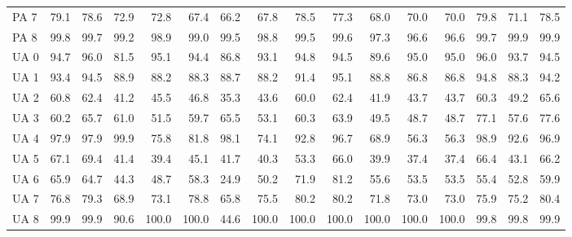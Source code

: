 \documentclass[a4paper,10pt,DIV=16]{scrartcl}
\begin{document}
\begin{table}[h]
\begin{tabular}{lrrrrrrrrrrrrrrr}
    PA 7 & 79.1 & 78.6 & 72.9 & 72.8 & 67.4 & 66.2 & 67.8 & 78.5 & 77.3 & 68.0 & 70.0 & 70.0 & 79.8 & 71.1 & 78.5 \\
    PA 8 & 99.8 & 99.7 & 99.2 & 98.9 & 99.0 & 99.5 & 98.8 & 99.5 & 99.6 & 97.3 & 96.6 & 96.6 & 99.7 & 99.9 & 99.9 \\
    UA 0 & 94.7 & 96.0 & 81.5 & 95.1 & 94.4 & 86.8 & 93.1 & 94.8 & 94.5 & 89.6 & 95.0 & 95.0 & 96.0 & 93.7 & 94.5 \\
    UA 1 & 93.4 & 94.5 & 88.9 & 88.2 & 88.3 & 88.7 & 88.2 & 91.4 & 95.1 & 88.8 & 86.8 & 86.8 & 94.8 & 88.3 & 94.2 \\
    UA 2 & 60.8 & 62.4 & 41.2 & 45.5 & 46.8 & 35.3 & 43.6 & 60.0 & 62.4 & 41.9 & 43.7 & 43.7 & 60.3 & 49.2 & 65.6 \\
    UA 3 & 60.2 & 65.7 & 61.0 & 51.5 & 59.7 & 65.5 & 53.1 & 60.3 & 63.9 & 49.5 & 48.7 & 48.7 & 77.1 & 57.6 & 77.6 \\
    UA 4 & 97.9 & 97.9 & 99.9 & 75.8 & 81.8 & 98.1 & 74.1 & 92.8 & 96.7 & 68.9 & 56.3 & 56.3 & 98.9 & 92.6 & 96.9 \\
    UA 5 & 67.1 & 69.4 & 41.4 & 39.4 & 45.1 & 41.7 & 40.3 & 53.3 & 66.0 & 39.9 & 37.4 & 37.4 & 66.4 & 43.1 & 66.2 \\
    UA 6 & 65.9 & 64.7 & 44.3 & 48.7 & 58.3 & 24.9 & 50.2 & 71.9 & 81.2 & 55.6 & 53.5 & 53.5 & 55.4 & 52.8 & 59.9 \\
    UA 7 & 76.8 & 79.3 & 68.9 & 73.1 & 78.8 & 65.8 & 75.5 & 80.2 & 80.2 & 71.8 & 73.0 & 73.0 & 75.9 & 75.2 & 80.4 \\
    UA 8 & 99.9 & 99.9 & 90.6 & 100.0 & 100.0 & 44.6 & 100.0 & 100.0 & 100.0 & 100.0 & 100.0 & 100.0 & 99.8 & 99.8 & 99.9 \\
  \end{tabular}
\end{table}
\end{document}
